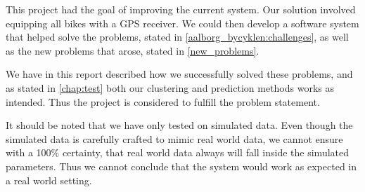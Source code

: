 This project had the goal of improving the current \citybike system.
Our solution involved equipping all bikes with a GPS receiver. We could then develop a software system that helped solve the problems, stated in \ref{aalborg_bycyklen:challenges}, as well as the new problems that arose, stated in \ref{new_problems}.

We have in this report described how we successfully solved these problems, and as stated in \ref{chap:test} both our clustering and prediction methods works as intended.
Thus the project is considered to fulfill the problem statement.

It should be noted that we have only tested on simulated data.
Even though the simulated data is carefully crafted to mimic real world data, we cannot ensure with a 100\% certainty, that real world data always will fall inside the simulated parameters. Thus we cannot conclude that the system would work as expected in a real world setting.
